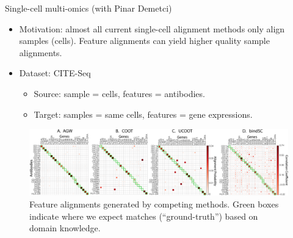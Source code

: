 \documentclass{beamer}
\begin{document}
\begin{frame}{Single-cell multi-omics (with Pinar Demetci)}
\scriptsize
\begin{itemize}
  \item Motivation: almost all current single-cell alignment methods only
  align samples (cells). Feature alignments can yield higher quality
  sample alignments.
  \item Dataset: CITE-Seq \parencite{CITEseq}
  \begin{itemize}
    \scriptsize
    \item Source: sample = cells, features = antibodies.
    \item Target: samples = same cells, features = gene expressions.
  \end{itemize}
\end{itemize}
\begin{figure}
  \centering
  \includegraphics[width=1.\linewidth, keepaspectratio=true]{OT_new/cite_fgcoot_final.pdf}
  \caption*{\scriptsize{Feature alignments generated by competing methods.
  Green boxes indicate where we expect matches (“ground-truth”)
  based on domain knowledge.}}
\end{figure}
\end{frame}
\end{document}
